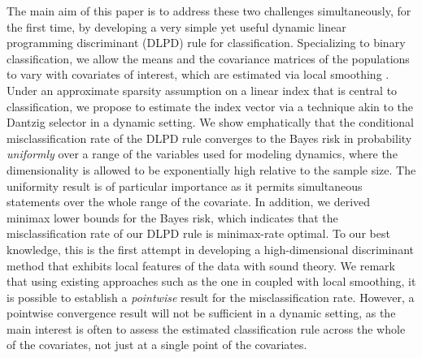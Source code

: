 \documentclass[11pt]{article}
\theoremstyle{definition}
\begin{document}
 The main aim of this paper is to address these two challenges simultaneously, for the first time,
 by developing a very simple yet useful dynamic linear programming discriminant (DLPD) rule for classification. Specializing to
 binary classification, we allow the means and the covariance matrices of the
 populations to vary with covariates of interest, which are estimated via local
 smoothing \citep{Fan1996}. Under an approximate sparsity assumption on a linear index that is central to classification, we propose to
 estimate the index vector via a technique akin to the Dantzig
 selector \citep{candes,Cai} in a dynamic setting. We show emphatically that
 the conditional misclassification rate of the DLPD rule converges to the Bayes
 risk in probability {\it uniformly} over a range of the variables used for
 modeling dynamics, where the dimensionality is allowed to be exponentially high relative to the sample size.
 The uniformity result is of particular importance as it
 permits simultaneous statements over the whole range of the covariate. In addition, we derived minimax lower bounds for the Bayes risk, which indicates that the misclassification rate of our DLPD rule is minimax-rate optimal. To our
 best knowledge, this is the first attempt in developing a high-dimensional
 discriminant method that exhibits local features of the data with sound theory. We remark that using existing approaches such as the one in \cite{Cai} coupled with local smoothing, it is possible to establish a {\it pointwise} result for the misclassification rate. However, a pointwise convergence result will not be sufficient in a dynamic setting, as the main interest is often to assess the estimated classification rule across the whole of the covariates, not just at a single point of the covariates.
 
\end{document}
